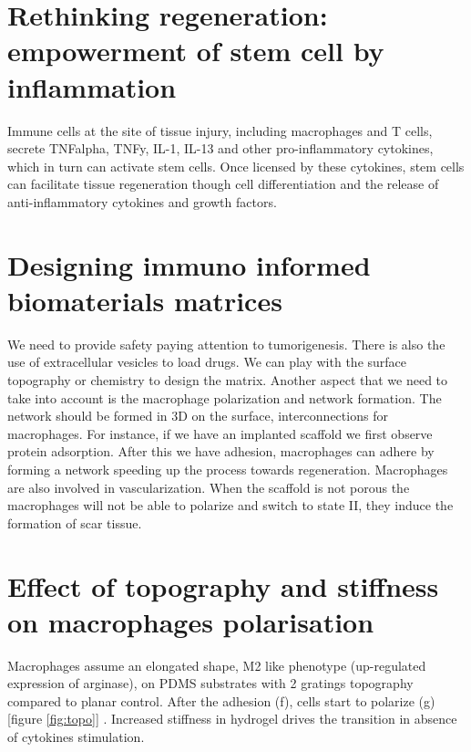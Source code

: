 \section{Rethinking regeneration: empowerment of stem cell by inflammation}
Immune cells at the site of tissue injury, including macrophages and T cells, secrete TNFalpha, TNFy, IL-1, IL-13 and other pro-inflammatory cytokines, which in turn can activate stem cells. 
Once licensed by these cytokines, stem cells can facilitate tissue regeneration though cell differentiation and the release of anti-inflammatory cytokines and growth factors.

\section{Designing immuno informed biomaterials matrices}
We need to provide safety paying attention to tumorigenesis.
There is also the use of extracellular vesicles to load drugs.
We can play with the surface topography or chemistry to design the matrix.
Another aspect that we need to take into account is the macrophage polarization and network formation.
The network should be formed in 3D on the surface, interconnections for macrophages.
For instance, if we have an implanted scaffold we first observe protein adsorption. 
After this we have adhesion, macrophages can adhere by forming a network speeding up the process towards regeneration. 
Macrophages are also involved in vascularization. 
When the scaffold is not porous the macrophages will not be able to polarize and switch to state II, they induce the formation of scar tissue.

\section{Effect of topography and stiffness on macrophages polarisation}
Macrophages assume an elongated shape, M2 like phenotype (up-regulated expression of arginase), on PDMS substrates with 2 gratings topography compared to planar control.
After the adhesion (f), cells start to polarize (g) [figure \ref{fig:topo}] .  Increased stiffness in hydrogel drives the transition in absence of cytokines stimulation. 

